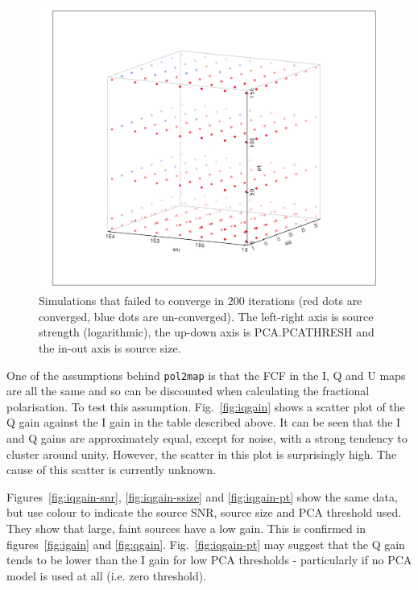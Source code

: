 \documentclass[twoside,11pt]{starlink}
\begin{document}
\begin{figure}
\includegraphics[width=0.9\columnwidth]{figs/converged}
\caption{Simulations that failed to converge in 200 iterations (red dots
are converged, blue dots are un-converged). The left-right axis is source
strength (logarithmic), the up-down axis is PCA.PCATHRESH and the in-out axis is source
size.}
\label{fig:converged}
\end{figure}

One of the assumptions behind \texttt{pol2map} is that the FCF in the I,
Q and U maps are all the same and so can be discounted when calculating
the fractional polarisation. To test this assumption.
Fig.~\ref{fig:iqgain} shows a scatter plot of the Q gain against the I
gain in the table described above. It can be seen that the I and Q gains
are approximately equal, except for noise, with a strong tendency
to cluster around unity. However, the scatter in this plot is surprisingly
high. The cause of this scatter is currently unknown.

Figures~\ref{fig:iqgain-snr}, \ref{fig:iqgain-ssize} and
\ref{fig:iqgain-pt} show the same data, but use colour to indicate the
source SNR, source size and PCA threshold used. They show that large,
faint sources have a low gain. This is confirmed in figures~\ref{fig:igain}
and \ref{fig:qgain}. Fig.~\ref{fig:iqgain-pt} may suggest that the Q gain
tends to be lower than the I gain for low PCA thresholds - particularly
if no PCA model is used at all (i.e. zero threshold).
\end{document}
